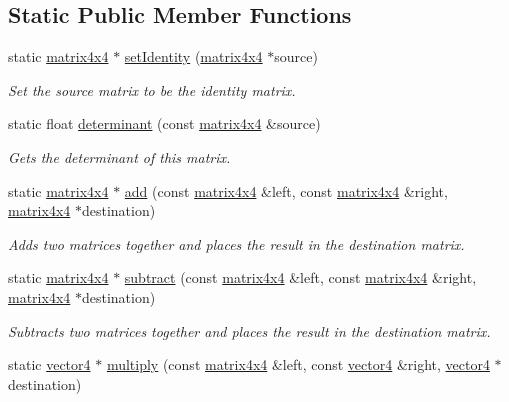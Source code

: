 \subsection*{Static Public Member Functions}
\begin{DoxyCompactItemize}
\item 
static \hyperlink{classflounder_1_1matrix4x4}{matrix4x4} $\ast$ \hyperlink{classflounder_1_1matrix4x4_a1e6d01f9949c6498de679e7db6c52aae}{set\+Identity} (\hyperlink{classflounder_1_1matrix4x4}{matrix4x4} $\ast$source)
\begin{DoxyCompactList}\small\item\em Set the source matrix to be the identity matrix. \end{DoxyCompactList}\item 
static float \hyperlink{classflounder_1_1matrix4x4_aed6f2bda7427d0edac8c8ec6b6a0dc84}{determinant} (const \hyperlink{classflounder_1_1matrix4x4}{matrix4x4} \&source)
\begin{DoxyCompactList}\small\item\em Gets the determinant of this matrix. \end{DoxyCompactList}\item 
static \hyperlink{classflounder_1_1matrix4x4}{matrix4x4} $\ast$ \hyperlink{classflounder_1_1matrix4x4_a9980ab4e5e8e974e84cb9d68fb6d2cde}{add} (const \hyperlink{classflounder_1_1matrix4x4}{matrix4x4} \&left, const \hyperlink{classflounder_1_1matrix4x4}{matrix4x4} \&right, \hyperlink{classflounder_1_1matrix4x4}{matrix4x4} $\ast$destination)
\begin{DoxyCompactList}\small\item\em Adds two matrices together and places the result in the destination matrix. \end{DoxyCompactList}\item 
static \hyperlink{classflounder_1_1matrix4x4}{matrix4x4} $\ast$ \hyperlink{classflounder_1_1matrix4x4_a1a5a10bb1c0e55f1fffc5559badc4e6b}{subtract} (const \hyperlink{classflounder_1_1matrix4x4}{matrix4x4} \&left, const \hyperlink{classflounder_1_1matrix4x4}{matrix4x4} \&right, \hyperlink{classflounder_1_1matrix4x4}{matrix4x4} $\ast$destination)
\begin{DoxyCompactList}\small\item\em Subtracts two matrices together and places the result in the destination matrix. \end{DoxyCompactList}\item 
static \hyperlink{classflounder_1_1vector4}{vector4} $\ast$ \hyperlink{classflounder_1_1matrix4x4_a971e94747366db81af609bb97da9b2ed}{multiply} (const \hyperlink{classflounder_1_1matrix4x4}{matrix4x4} \&left, const \hyperlink{classflounder_1_1vector4}{vector4} \&right, \hyperlink{classflounder_1_1vector4}{vector4} $\ast$destination)

\end{DoxyCompactItemize}

